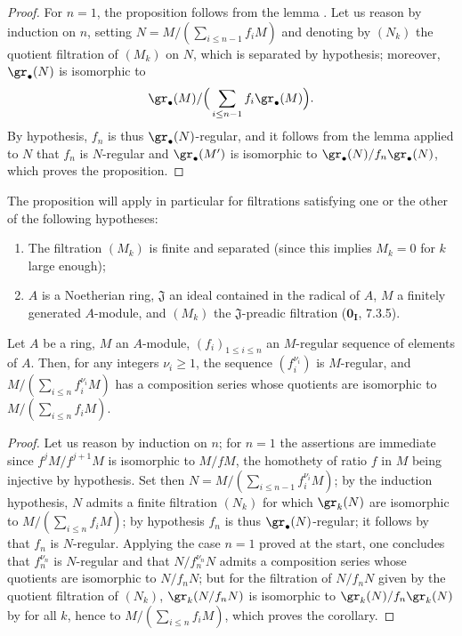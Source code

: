 \begin{proof}
For $n=1$, the proposition follows from the lemma .
Let us reason by induction on $n$, setting $N=M/(\sum_{i\leq n-1}f_iM)$ and denoting by $(N_k)$ the quotient filtration of $(M_k)$ on $N$, which is separated by hypothesis;
moreover, $\gr_\bullet(N)$ is isomorphic to
\[
  \gr_\bullet(M)/\Big(\sum_{i\leq n-1}f_i\gr_\bullet(M)\Big).
\]
By hypothesis, $f_n$ is thus $\gr_\bullet(N)$-regular, and it follows from the lemma  applied to $N$ that $f_n$ is $N$-regular and $\gr_\bullet(M')$ is isomorphic to $\gr_\bullet(N)/f_n\gr_\bullet(N)$, which proves the proposition.
\end{proof}

The proposition  will apply in particular for filtrations satisfying one or the other of the following hypotheses:
\begin{enumerate}
  \item[$1^\circ$] The filtration $(M_k)$ is finite and separated (since this implies $M_k=0$ for $k$ large enough);
  \item[$2^\circ$] $A$ is a Noetherian ring, $\mathfrak{J}$ an ideal contained in the radical of $A$, $M$ a finitely generated $A$-module, and $(M_k)$ the $\mathfrak{J}$-preadic filtration ($\mathbf{0_I}$, 7.3.5).
\end{enumerate}

\begin{corollary}[15.1.20]
\label{0.15.1.20}
Let $A$ be a ring, $M$ an $A$-module, $(f_i)_{1\leq i\leq n}$ an $M$-regular sequence of elements of $A$.
Then, for any integers $\nu_i\geq 1$, the sequence $(f_i^{\nu_i})$ is $M$-regular, and $M/(\sum_{i\leq n}f_i^{\nu_i}M)$ has a composition series whose quotients are isomorphic to $M/(\sum_{i\leq n}f_iM)$.
\end{corollary}

\begin{proof}
Let us reason by induction on $n$;
for $n=1$ the assertions are immediate since $f^jM/f^{j+1}M$ is isomorphic to $M/fM$, the homothety of ratio $f$ in $M$ being injective by hypothesis.
Set then $N=M/(\sum_{i\leq n-1}f_i^{\nu_i}M)$;
by the induction hypothesis, $N$ admits a finite filtration $(N_k)$ for which $\gr_k(N)$ are isomorphic to $M/(\sum_{i\leq n}f_iM)$;
by hypothesis $f_n$ is thus $\gr_\bullet(N)$-regular;
it follows by  that $f_n$ is $N$-regular.
Applying the case $n=1$ proved at the start, one concludes that $f_n^{\nu_n}$ is $N$-regular and that $N/f_n^{\nu_n}N$ admits a composition series whose quotients are isomorphic to $N/f_nN$;
but for the filtration of $N/f_nN$ given by the quotient filtration of $(N_k)$, $\gr_k(N/f_nN)$ is isomorphic to $\gr_k(N)/f_n\gr_k(N)$ by  for all $k$, hence to $M/(\sum_{i\leq n}f_iM)$, which proves the corollary.
\end{proof}

